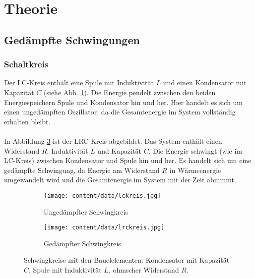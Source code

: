 \section{Theorie}
\label{sec:Theorie}

\subsection{Gedämpfte Schwingungen}
\subsubsection{Schaltkreis}
Der LC-Kreis enthält eine Spule mit Induktivität $L$ und einen Kondensator mit Kapazität $C$ (siehe Abb. \ref{fig:lckreis}).
Die Energie pendelt zwischen den beiden Energiespeichern Spule und Kondensator hin und her.
Hier handelt es sich um einen ungedämpften Oszillator, da die Gesamtenergie im System vollständig erhalten bleibt.
\\\\
In Abbildung \ref{fig:lrckreis} ist der LRC-Kreis abgebildet.
Das System enthält einen Widerstand $R$, Induktivität $L$ und Kapazität $C$.
Die Energie schwingt (wie im LC-Kreis) zwischen Kondensator und Spule hin und her.
Es handelt sich um eine gedämpfte Schwingung, da Energie am Widerstand $R$ in Wärmeenergie umgewandelt wird und die Gesamtenergie im System mit der Zeit abnimmt.

\begin{figure}
    \centering
    \begin{subfigure}{0.48\textwidth}
        \centering
        \texttt{[image: content/data/lckreis.jpg]}
        \caption{Ungedämpfter Schwingkreis}
        \label{fig:lckreis}
    \end{subfigure}
    \begin{subfigure}{0.48\textwidth}
        \centering
        \texttt{[image: content/data/lrckreis.jpg]}
        \caption{Gedämpfter Schwingkreis} 
        \label{fig:lrckreis}
    \end{subfigure}
    \caption{Schwingkreise mit den Bauelelementen: Kondensator mit Kapazität $C$, Spule mit Induktivität $L$, ohmscher Widerstand $R$. \cite[S.284]{anleitung}}
\end{figure}

